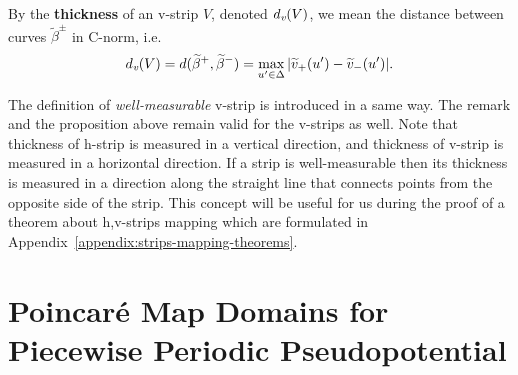 \begin{definition}
	By the {\bf thickness} of an v-strip $V$, denoted $d_\emph{v}(V)$, we mean the distance between curves $\widetilde{\beta}^{\pm}$ in C-norm, i.e.
	\begin{equation}
		d_\emph{v}(V) = d(\widetilde{\beta}^+, \widetilde{\beta}^-) = \max \limits_{u' \in \Delta} |\widetilde{v}_+(u') - \widetilde{v}_-(u')|.
	\label{eq:v-thickness}
	\end{equation}
\label{def:v-thickness}
\end{definition}

The definition of {\it well-measurable} v-strip is introduced in a same way.
The remark and the proposition above remain valid for the v-strips as well.
Note that thickness of h-strip is measured in a vertical direction, and thickness of v-strip is measured in a horizontal direction.
If a strip is well-measurable then its thickness is measured in a direction along the straight line that connects points from the opposite side of the strip.
This concept will be useful for us during the proof of a theorem about h,v-strips mapping which are formulated in Appendix~\ref{appendix:strips-mapping-theorems}.

\section{Poincar\'e Map Domains for Piecewise Periodic Pseudopotential}

